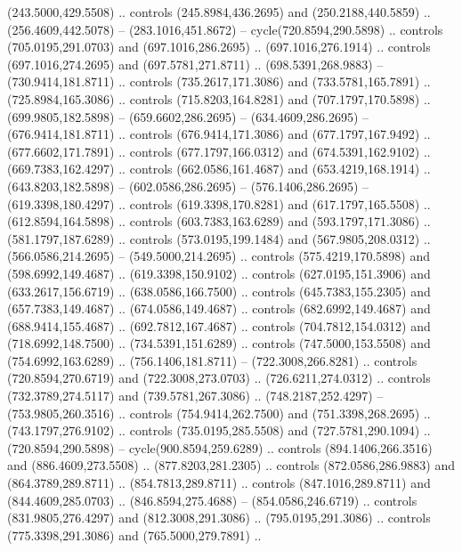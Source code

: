 {{\begin{scope}[y=-0.80pt,x=0.80pt,scale=0.038,xshift=-750pt,yshift=125pt]
        (243.5000,429.5508) .. controls (245.8984,436.2695) and (250.2188,440.5859) ..
        (256.4609,442.5078) -- (283.1016,451.8672) -- cycle(720.8594,290.5898) ..
        controls (705.0195,291.0703) and (697.1016,286.2695) .. (697.1016,276.1914) ..
        controls (697.1016,274.2695) and (697.5781,271.8711) .. (698.5391,268.9883) --
        (730.9414,181.8711) .. controls (735.2617,171.3086) and (733.5781,165.7891) ..
        (725.8984,165.3086) .. controls (715.8203,164.8281) and (707.1797,170.5898) ..
        (699.9805,182.5898) -- (659.6602,286.2695) -- (634.4609,286.2695) --
        (676.9414,181.8711) .. controls (676.9414,171.3086) and (677.1797,167.9492) ..
        (677.6602,171.7891) .. controls (677.1797,166.0312) and (674.5391,162.9102) ..
        (669.7383,162.4297) .. controls (662.0586,161.4687) and (653.4219,168.1914) ..
        (643.8203,182.5898) -- (602.0586,286.2695) -- (576.1406,286.2695) --
        (619.3398,180.4297) .. controls (619.3398,170.8281) and (617.1797,165.5508) ..
        (612.8594,164.5898) .. controls (603.7383,163.6289) and (593.1797,171.3086) ..
        (581.1797,187.6289) .. controls (573.0195,199.1484) and (567.9805,208.0312) ..
        (566.0586,214.2695) -- (549.5000,214.2695) .. controls (575.4219,170.5898) and
        (598.6992,149.4687) .. (619.3398,150.9102) .. controls (627.0195,151.3906) and
        (633.2617,156.6719) .. (638.0586,166.7500) .. controls (645.7383,155.2305) and
        (657.7383,149.4687) .. (674.0586,149.4687) .. controls (682.6992,149.4687) and
        (688.9414,155.4687) .. (692.7812,167.4687) .. controls (704.7812,154.0312) and
        (718.6992,148.7500) .. (734.5391,151.6289) .. controls (747.5000,153.5508) and
        (754.6992,163.6289) .. (756.1406,181.8711) -- (722.3008,266.8281) .. controls
        (720.8594,270.6719) and (722.3008,273.0703) .. (726.6211,274.0312) .. controls
        (732.3789,274.5117) and (739.5781,267.3086) .. (748.2187,252.4297) --
        (753.9805,260.3516) .. controls (754.9414,262.7500) and (751.3398,268.2695) ..
        (743.1797,276.9102) .. controls (735.0195,285.5508) and (727.5781,290.1094) ..
        (720.8594,290.5898) -- cycle(900.8594,259.6289) .. controls
        (894.1406,266.3516) and (886.4609,273.5508) .. (877.8203,281.2305) .. controls
        (872.0586,286.9883) and (864.3789,289.8711) .. (854.7813,289.8711) .. controls
        (847.1016,289.8711) and (844.4609,285.0703) .. (846.8594,275.4688) --
        (854.0586,246.6719) .. controls (831.9805,276.4297) and (812.3008,291.3086) ..
        (795.0195,291.3086) .. controls (775.3398,291.3086) and (765.5000,279.7891) ..

\end{scope}}}
